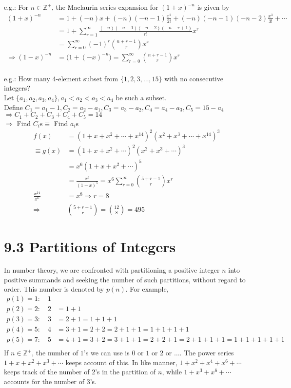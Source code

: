 \documentclass[a4paper]{article}
\begin{document}
\color{red}e.g.: \color{black} For $n\in\mathbb{Z}^+$, the Maclaurin series expansion for $(1+x)^{-n}$ is given by
\begin{align*}
    (1+x)^{-n}&=1+(-n)x+(-n)(-n-1)\frac{x^2}{2!}+(-n)(-n-1)(-n-2)\frac{x^3}{3!}+\cdots\\
    &=1+\sum_{r=1}^{\infty}{\frac{(-n)(-n-1)(-n-2)(-n-r+1)}{r!}x^r}\\
    &=\sum_{r=0}^{\infty}{(-1)^r\binom{n+r-1}{r} x^r}\\
    \Rightarrow (1-x)^{-n}&=\bigl(1+(-x)^{-n}\bigr)=\sum_{r=0}^{\infty}{\binom{n+r-1}{r} x^r}\\
\end{align*}

\color{red}e.g.: \color{black} How many 4-element subset from $\{1,2,3,\ldots,15\}$ with no consecutive integers?\\
Let $\{a_1,a_2,a_3,a_4\}, a_1<a_2<a_3<a_4$ be such a subset.\\
Define $C_1=a_1-1,C_2=a_2-a_1,C_3=a_3-a_2,C_4=a_4-a_3,C_5=15-a_4$\\
$\Rightarrow C_1+C_2+C_3+C_4+C_5=14$\\
$\Rightarrow$ Find $C_i\text{s}\equiv$ Find $a_i\text{s}$
\begin{align*}
f(x)&=(1+x+x^2+\cdots+x^{14})^2(x^2+x^3+\cdots+x^{14})^3\\
\equiv g(x)&=(1+x+x^2+\cdots)^2(x^2+x^3+\cdots)^3\\
&=x^6(1+x+x^2+\cdots)^5\\
&=\frac{x^6}{(1-x)^5}=x^6\sum_{r=0}^{\infty}{\binom{5+r-1}{r}x^r}\\
\frac{x^14}{x^6}&=x^8\Rightarrow r=8\\
\Rightarrow&\binom{5+r-1}{r}=\binom{12}{8}=495
\end{align*}

\section*{9.3 Partitions of Integers}
In number theory, we are confronted with partitioning a positive integer $n$ into positive summands and seeking the number of such partitions, without regard to order. This number is denoted by $p(n)$. For example,
\begin{align*}
p(1) = 1:\quad 1&\\
p(2) = 2:\quad 2& = 1+1\\
p(3) = 3:\quad 3& = 2+1 = 1+1+1\\
p(4) = 5:\quad 4&=3+1=2+2=2+1+1=1+1+1+1\\
p(5) = 7:\quad 5&=4+1=3+2=3+1+1=2+2+1=2+1+1+1=1+1+1+1+1\\
\end{align*}
If $n\in \mathbb{Z}^+$, the number of $1$'s we can use is $0$ or $1$ or $2$ or $\dots$. The power series $1+x+x^2+x^3+\cdots$ keeps account of this. In like manner, $1+x^2+x^4+x^6+\cdots$ keeps track of the number of $2$'s in the partition of $n$, while $1+x^3+x^6+\cdots$ accounts for the number of $3$'s.
\end{document}

